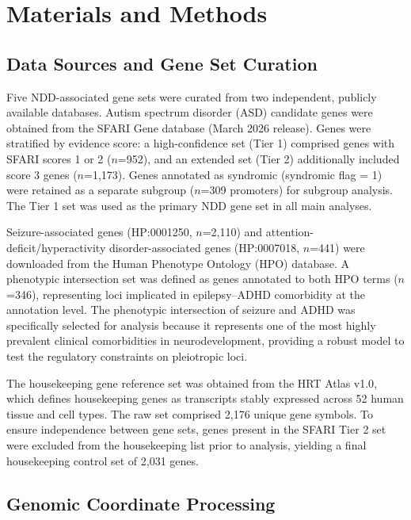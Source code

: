 \documentclass[preprints,briefreport,submit,pdftex,oneauthor]{Definitions/mdpi}
\begin{document}
\section{Materials and Methods}

\subsection{Data Sources and Gene Set Curation}

Five NDD-associated gene sets were curated from two independent,
publicly available databases.
Autism spectrum disorder (ASD) candidate genes were obtained
from the SFARI Gene database (March 2026 release)\cite{sfari}.
Genes were stratified by evidence score: a high-confidence set
(Tier 1) comprised genes with SFARI scores 1 or 2 ($n$=952),
and an extended set (Tier 2) additionally included score 3 genes
($n$=1,173). Genes annotated as syndromic (syndromic flag = 1)
were retained as a separate subgroup ($n$=309 promoters) for
subgroup analysis. The Tier 1 set was used as the primary NDD
gene set in all main analyses.

Seizure-associated genes (HP:0001250, $n$=2,110) and
attention-deficit/hyperactivity disorder-associated genes
(HP:0007018, $n$=441) were downloaded from the Human
Phenotype Ontology (HPO) database\cite{hpo}.
A phenotypic intersection set was defined as genes annotated to both HPO
terms ($n$=346), representing loci implicated in
epilepsy--ADHD comorbidity at the annotation level. 
The phenotypic intersection of seizure and ADHD was specifically selected for analysis because it represents one of the most highly prevalent clinical comorbidities in neurodevelopment, providing a robust model to test the regulatory constraints on pleiotropic loci\cite{fan2023}.

The housekeeping gene reference set was obtained from the
HRT Atlas v1.0\cite{hounkpe2021}, which defines housekeeping
genes as transcripts stably expressed across 52 human tissue
and cell types.
The raw set comprised 2,176 unique gene
symbols. To ensure independence between gene sets, genes
present in the SFARI Tier 2 set were excluded from the
housekeeping list prior to analysis, yielding a final
housekeeping control set of 2,031 genes.

\subsection{Genomic Coordinate Processing}
\end{document}
